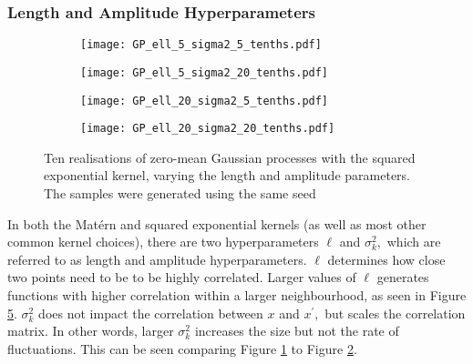 \subsubsection*{Length and Amplitude Hyperparameters}

\begin{figure}[htbp]
    \centering
    \begin{subfigure}[b]{0.5\textwidth}
        \centering
        \texttt{[image: GP\_ell\_5\_sigma2\_5\_tenths.pdf]}
        \label{fig:half_half}
    \end{subfigure}%
    \hfill%
    \begin{subfigure}[b]{0.5\textwidth}
        \centering
        \texttt{[image: GP\_ell\_5\_sigma2\_20\_tenths.pdf]}
        \label{fig:half_two}
    \end{subfigure}
    \begin{subfigure}[b]{0.5\textwidth}
        \centering
        \texttt{[image: GP\_ell\_20\_sigma2\_5\_tenths.pdf]}
        \label{fig:two_half}
    \end{subfigure}%
    \hfill%
    \begin{subfigure}[b]{0.5\textwidth}
        \centering
        \texttt{[image: GP\_ell\_20\_sigma2\_20\_tenths.pdf]}
        \label{fig:two_two}
    \end{subfigure}%
    \caption[{
        Gaussian process realisations with differing length and scale
        hyperparameters in a squared exponential kernel.
    }]{
        Ten realisations of zero-mean Gaussian processes with the squared
        exponential kernel, varying the length and amplitude parameters.
        The samples were generated using the same seed
    }
    \label{fig:length_amp}
\end{figure}

In both the Mat\'ern and squared exponential kernels
(as well as most other common kernel choices), there are two
hyperparameters $\ell$ and $\sigma^2_k,$ which are referred to as length and
amplitude hyperparameters. $\ell$ determines how close two points need
to be to be highly correlated. Larger values of $\ell$ generates functions with
higher correlation within a larger neighbourhood,
as seen in Figure \ref{fig:length_amp}. $\sigma^2_k$ does not impact
the correlation between $x$ and $x^\prime,$ but scales the correlation
matrix. In other words, larger $\sigma^2_k$ increases the size but not the rate of
fluctuations. This can be seen comparing Figure \ref{fig:half_half} to Figure
\ref{fig:half_two}.

